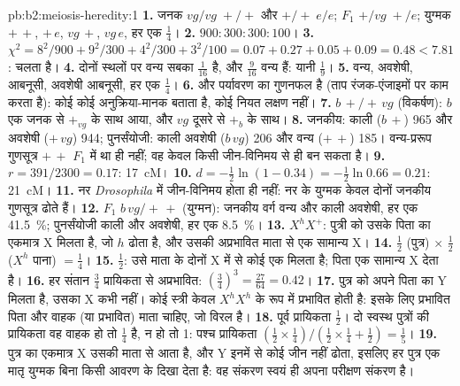 \begin{solution}{pb:b2:meiosis-heredity:1}
\textbf{1.} जनक $vg/vg\;+/+$ और $+/+\;e/e$; $F_1$ $+/vg\;+/e$;
युग्मक $+\,+$, $+\,e$, $vg\,+$, $vg\,e$, हर एक $\tfrac14$।
\textbf{2.} $900 : 300 : 300 : 100$।
\textbf{3.} $\chi^2 = 8^2/900 + 9^2/300 + 4^2/300 + 3^2/100 = 0.07 +
0.27 + 0.05 + 0.09 = 0.48 < 7.81$:  चलता है।
\textbf{4.} दोनों स्थलों पर  वन्य सबका $\tfrac{1}{16}$ है,
और $\tfrac{9}{16}$ वन्य हैं: यानी $\tfrac19$।
\textbf{5.} वन्य, अवशेषी, आबनूसी, अवशेषी आबनूसी, हर एक $\tfrac14$।
\textbf{6.}   और पर्यावरण का गुणनफल है
(ताप रंजक-एंजाइमों पर काम करता है): कोई  कोई
अनुक्रिया-मानक बताता है, कोई नियत लक्षण नहीं।
\textbf{7.} $b\,+/+\,vg$ (विकर्षण): $b$ एक जनक से $+_{vg}$ के साथ आया,
और $vg$ दूसरे से $+_b$ के साथ।
\textbf{8.} जनकीय: काली ($b\,+$) 965 और अवशेषी ($+\,vg$) 944;
पुनर्संयोजी: काली अवशेषी ($b\,vg$) 206 और वन्य ($+\,+$) 185।
वन्य-प्ररूप गुणसूत्र $+\,+$ $F_1$ में था ही नहीं; वह केवल किसी
जीन-विनिमय से ही बन सकता है।
\textbf{9.} $r = 391/2300 = 0.17$: \qty{17}{cM}।
\textbf{10.} $d = -\tfrac12\ln(1 - 0.34) = -\tfrac12\ln 0.66 = 0.21$:
\qty{21}{cM}।
\textbf{11.} नर \emph{Drosophila} में जीन-विनिमय होता ही नहीं:
नर के युग्मक केवल दोनों जनकीय गुणसूत्र ढोते हैं।
\textbf{12.} $F_1$ $b\,vg/+\,+$ (युग्मन): जनकीय वर्ग वन्य और
काली अवशेषी, हर एक \qty{41.5}{\%}; पुनर्संयोजी काली और
अवशेषी, हर एक \qty{8.5}{\%}।
\textbf{13.} $X^hX^+$: पुत्री को उसके पिता का एकमात्र X मिलता है, जो
$h$ ढोता है, और उसकी अप्रभावित माता से एक सामान्य X।
\textbf{14.} $\tfrac12$ (पुत्र) $\times$ $\tfrac12$ ($X^h$ पाना) $=
\tfrac14$।
\textbf{15.} $\tfrac12$: उसे माता के दोनों X में से कोई एक मिलता है;
पिता एक सामान्य X देता है।
\textbf{16.} हर संतान $\tfrac34$ प्रायिकता से अप्रभावित:
$(\tfrac34)^3 = \tfrac{27}{64} = 0.42$।
\textbf{17.} पुत्र को अपने पिता का Y मिलता है, उसका X कभी नहीं। कोई
स्त्री केवल $X^hX^h$ के रूप में प्रभावित होती है: इसके लिए प्रभावित
पिता और वाहक (या प्रभावित) माता चाहिए, जो विरल है।
\textbf{18.} पूर्व प्रायिकता $\tfrac12$। दो स्वस्थ पुत्रों की प्रायिकता
वह वाहक हो तो $\tfrac14$ है, न हो तो 1: पश्च प्रायिकता $(\tfrac12\times
\tfrac14)/(\tfrac12\times\tfrac14 + \tfrac12) = \tfrac15$।
\textbf{19.} पुत्र का एकमात्र X उसकी माता से आता है, और Y इनमें से कोई
जीन नहीं ढोता, इसलिए हर पुत्र एक मातृ युग्मक बिना किसी आवरण के दिखा
देता है: वह संकरण स्वयं ही अपना परीक्षण संकरण है।

\end{solution}
